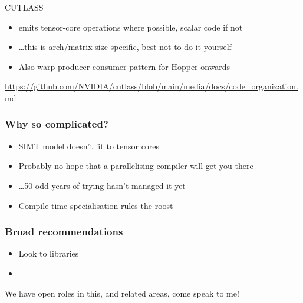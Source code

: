 \documentclass[aspectratio=169]{beamer}
\begin{document}
\begin{frame}[fragile]
\begin{onlyenv}
\begin{block}{CUTLASS}
\begin{itemize}
      \item emits tensor-core operations where possible, scalar code
        if not
      \item \dots this is arch/matrix size-specific, best not to do it
        yourself
      \item Also warp producer-consumer pattern for Hopper onwards
      \end{itemize}
    \end{block}
    {
      \scriptsize
      \raggedleft
      \url{https://github.com/NVIDIA/cutlass/blob/main/media/docs/code_organization.md}
      \par
    }
  \end{onlyenv}
\end{frame}

\begin{frame}
  \frametitle{Why so complicated?}
  \begin{itemize}
  \item SIMT model doesn't fit to tensor cores
  \item Probably no hope that a parallelising compiler will get you
    there
  \item \dots 50-odd years of trying hasn't managed it yet
  \item Compile-time specialisation rules the roost
  \end{itemize}
\end{frame}

\begin{frame}
  \frametitle{Broad recommendations}
  \begin{itemize}
  \item Look to libraries
  \item 
  \end{itemize}
\end{frame}

\begin{frame}
  \begin{center}
    We have open roles in this, and related areas, come speak to me!
  \end{center}
\end{frame}

\end{document}
